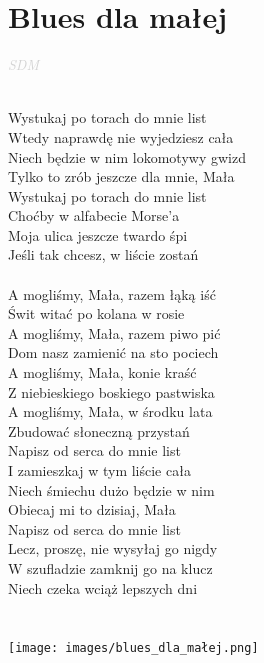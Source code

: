\documentclass[a5paper, 10pt]{book}
\begin{document}
\newpage
\section{Blues dla małej}\textcolor{lightgray}{\textit{SDM}}\\~\\
\begin{minipage}[t]{0.8\textwidth}
Wystukaj po torach do mnie list\\
Wtedy naprawdę nie wyjedziesz cała\\
Niech będzie w nim lokomotywy gwizd\\
Tylko to zrób jeszcze dla mnie, Mała\\
Wystukaj po torach do mnie list\\
Choćby w alfabecie Morse'a\\
Moja ulica jeszcze twardo śpi\\
Jeśli tak chcesz, w liście zostań\\
\\
\hspace*{4mm} A mogliśmy, Mała, razem łąką iść\\
\hspace*{4mm} Świt witać po kolana w rosie\\
\hspace*{4mm} A mogliśmy, Mała, razem piwo pić\\
\hspace*{4mm} Dom nasz zamienić na sto pociech\\
\hspace*{4mm} A mogliśmy, Mała, konie kraść\\
\hspace*{4mm} Z niebieskiego boskiego pastwiska\\
\hspace*{4mm} A mogliśmy, Mała, w środku lata\\
\hspace*{4mm} Zbudować słoneczną przystań\\

Napisz od serca do mnie list\\
I zamieszkaj w tym liście cała\\
Niech śmiechu dużo będzie w nim\\
Obiecaj mi to dzisiaj, Mała\\
Napisz od serca do mnie list\\
Lecz, proszę, nie wysyłaj go nigdy\\
W szufladzie zamknij go na klucz\\
Niech czeka wciąż lepszych dni\\
\\
\\
\texttt{[image: images/blues\_dla\_małej.png]}\\
\end{minipage}
\end{document}
